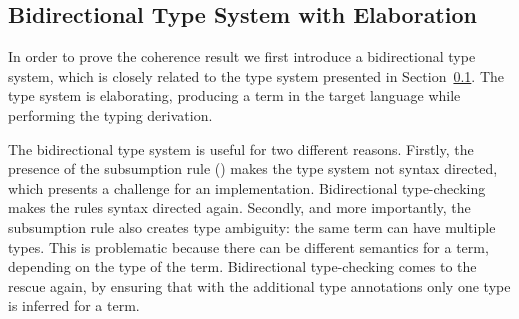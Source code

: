 %
%
%
%




\subsection{Bidirectional Type System with Elaboration}

In order to prove the coherence result we first introduce a bidirectional
type system, which is closely related to the type system presented in
Section~\ref{}. The type system is elaborating, producing a term 
in the target language while performing the typing derivation.

The bidirectional type system is useful for two different
reasons. Firstly, the presence of the subsumption rule
() makes the type system not syntax directed,
which presents a challenge for an implementation. Bidirectional
type-checking makes the rules syntax directed again.  Secondly, and
more importantly, the subsumption rule also creates type ambiguity:
the same term can have multiple types. This is problematic because
there can be different semantics for a term, depending on the type of
the term. Bidirectional type-checking comes to the rescue again, by
ensuring that with the additional type annotations only one type is
inferred for a term.

